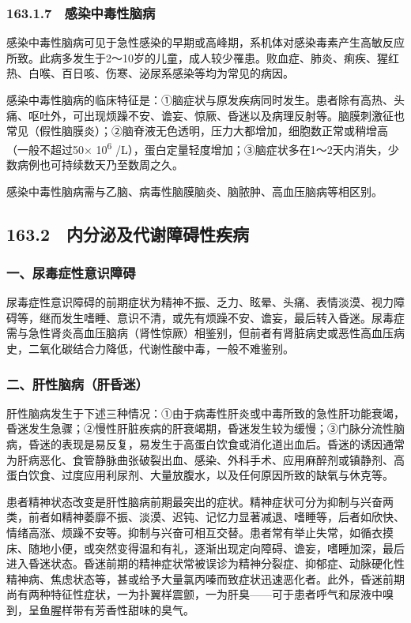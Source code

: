 \subsubsection{163.1.7　感染中毒性脑病}

感染中毒性脑病可见于急性感染的早期或高峰期，系机体对感染毒素产生高敏反应所致。此病多发生于2～10岁的儿童，成人较少罹患。败血症、肺炎、痢疾、猩红热、白喉、百日咳、伤寒、泌尿系感染等均为常见的病因。

感染中毒性脑病的临床特征是：①脑症状与原发疾病同时发生。患者除有高热、头痛、呕吐外，可出现烦躁不安、谵妄、惊厥、昏迷以及病理反射等。脑膜刺激征也常见（假性脑膜炎）；②脑脊液无色透明，压力大都增加，细胞数正常或稍增高（一般不超过50×
10\textsuperscript{6}
/L），蛋白定量轻度增加；③脑症状多在1～2天内消失，少数病例也可持续数天乃至数周之久。

感染中毒性脑病需与乙脑、病毒性脑膜脑炎、脑脓肿、高血压脑病等相区别。

\protect\hypertarget{text00371.html}{}{}

\subsection{163.2　内分泌及代谢障碍性疾病}

\subsubsection{一、尿毒症性意识障碍}

尿毒症性意识障碍的前期症状为精神不振、乏力、眩晕、头痛、表情淡漠、视力障碍等，继而发生嗜睡、意识不清，或先有烦躁不安、谵妄，最后转入昏迷。尿毒症需与急性肾炎高血压脑病（肾性惊厥）相鉴别，但前者有肾脏病史或恶性高血压病史，二氧化碳结合力降低，代谢性酸中毒，一般不难鉴别。

\subsubsection{二、肝性脑病（肝昏迷）}

肝性脑病发生于下述三种情况：①由于病毒性肝炎或中毒所致的急性肝功能衰竭，昏迷发生急骤；②慢性肝脏疾病的肝衰竭期，昏迷发生较为缓慢；③门脉分流性脑病，昏迷的表现是易反复，易发生于高蛋白饮食或消化道出血后。昏迷的诱因通常为肝病恶化、食管静脉曲张破裂出血、感染、外科手术、应用麻醉剂或镇静剂、高蛋白饮食、过度应用利尿剂、大量放腹水，以及任何原因所致的缺氧与休克等。

患者精神状态改变是肝性脑病前期最突出的症状。精神症状可分为抑制与兴奋两类，前者如精神萎靡不振、淡漠、迟钝、记忆力显著减退、嗜睡等，后者如欣快、情绪高涨、烦躁不安等。抑制与兴奋可相互交替。患者常有举止失常，如循衣摸床、随地小便，或突然变得温和有礼，逐渐出现定向障碍、谵妄，嗜睡加深，最后进入昏迷状态。昏迷前期的精神症状常被误诊为精神分裂症、抑郁症、动脉硬化性精神病、焦虑状态等，甚或给予大量氯丙嗪而致症状迅速恶化者。此外，昏迷前期尚有两种特征性症状，一为扑翼样震颤，一为肝臭------可于患者呼气和尿液中嗅到，呈鱼腥样带有芳香性甜味的臭气。

